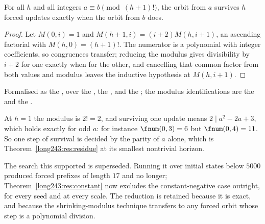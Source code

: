 \begin{theorem}\label{long243:res:residue}
For all $h$ and all integers $a\equiv b \pmod{(h+1)!}$, the orbit from $a$
survives $h$ forced updates exactly when the orbit from $b$ does.
\end{theorem}

\begin{proof}
Let $M(0,i)=1$ and $M(h+1,i)=(i+2)M(h,i+1)$, an ascending factorial with
$M(h,0)=(h+1)!$.  The numerator is a polynomial with integer coefficients, so
congruences transfer; reducing the modulus gives divisibility by $i+2$ for one
exactly when for the other, and cancelling that common factor from both values
and modulus leaves the inductive hypothesis at $M(h,i+1)$.
\end{proof}

\noindent Formalised as the
, over the
, the
, and the
; the modulus identifications are the
 and the
.

At $h=1$ the modulus is $2!=2$, and surviving one update means
$2\mid a^{2}-2a+3$, which holds exactly for odd $a$: for instance
$\fnum(0,3)=6$ but $\fnum(0,4)=11$.  So one step of survival is decided by the
parity of $a$ alone, which is Theorem~\ref{long243:res:residue} at its smallest
nontrivial horizon.

The search this supported is superseded.  Running it over initial states below
$5000$ produced forced prefixes of length $17$ and no longer;
Theorem~\ref{long243:res:constant} now excludes the
constant-negative case outright, for every seed and at every scale.  The
reduction is retained because it is exact, and because the shrinking-modulus
technique transfers to any forced orbit whose step is a polynomial division.

